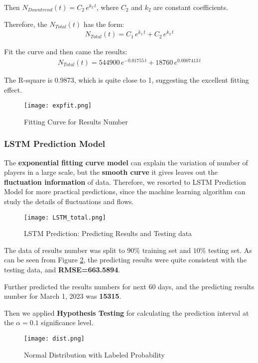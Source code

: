 Then $N_{Downtrend}(t)=C_{2}\,e^{k_{2}\,t}$, where $C_{2}$ and $k_{2}$ are constant coefficients.

Therefore, the $N_{Total}(t)$ has the form:
\begin{align}
    N_{Total}(t)=C_{1}\,e^{k_{1}\,t}+C_{2}\,e^{k_{2}\,t}
\end{align}

Fit the curve and then came the results:
\begin{align}
    N_{Total}(t)=544900\,e^{-0.01755\,t}+18760\,e^{0.0007413\,t}
\end{align}

The R-square is 0.9873, which is quite close to 1, suggesting the excellent fitting effect.
\begin{figure}[h]
    \centering
    \texttt{[image: expfit.png]}
    \caption{Fitting Curve for Results Number}
    \label{fitting curve}
\end{figure}

\subsubsection{LSTM Prediction Model}
\par The \textbf{exponential fitting curve model} can explain the variation of number of players in a large scale, but the \textbf{smooth curve} it gives leaves out the \textbf{fluctuation information} of data. Therefore, we resorted to LSTM Prediction Model for more practical predictions, since the machine learning algorithm can study the details of fluctuations and flows.

\begin{figure}[h]
    \centering
    \texttt{[image: LSTM\_total.png]}
    \caption{LSTM Prediction: Predicting Results and Testing data}
    \label{LSTM Graph}
\end{figure}

The data of results number was split to $90\%$ training set and $10\%$ testing set. As can be seen from Figure \ref{LSTM Graph}, the predicting results were quite consistent with the testing data, and \textbf{RMSE=663.5894}.

Further predicted the results numbers for next 60 days, and the predicting results number for March 1, 2023 was \textbf{15315}.

Then we applied \textbf{Hypothesis Testing} for calculating the prediction interval at the $\alpha=0.1$ significance level.

\begin{figure}[h]
    \centering
    \texttt{[image: dist.png]}
    \caption{Normal Distribution with Labeled Probability}
    \label{norm dist}
\end{figure}

